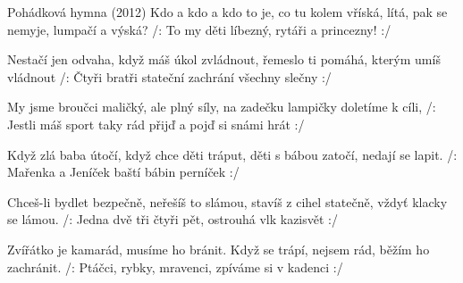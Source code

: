 \begin{TEXT}{Pohádková hymna (2012)}
\REFREN Kdo a kdo a kdo to je,
co tu kolem vříská,
lítá, pak se nemyje,
lumpačí a výská?
\REFREN /: To my děti líbezný,
rytáři a princezny! :/

\SLOKA Nestačí jen odvaha,
když máš úkol zvládnout,
řemeslo ti pomáhá,
kterým umíš vládnout
/: Čtyři bratři stateční
zachrání všechny slečny :/

\SLOKA My jsme broučci maličký,
ale plný síly,
na zadečku lampičky
doletíme k cíli,
/: Jestli máš sport taky rád
přijď a pojď si snámi hrát :/

\REFRENHRAJ

\SLOKA Když zlá baba útočí,
když chce děti tráput,
děti s bábou zatočí,
nedají se lapit.
/: Mařenka a Jeníček
baští bábin perníček :/

\SLOKA Chceš-li bydlet bezpečně,
neřešíš to slámou,
stavíš z cihel statečně,
vždyť klacky se lámou.
/: Jedna dvě tři čtyři pět,
ostrouhá vlk kazisvět :/

\REFRENHRAJ

\SLOKA Zvířátko je kamarád,
musíme ho bránit.
Když se trápí, nejsem rád,
běžím ho zachránit.
/: Ptáčci, rybky, mravenci,
zpíváme si v kadenci :/

\REFRENHRAJ

\end{TEXT}